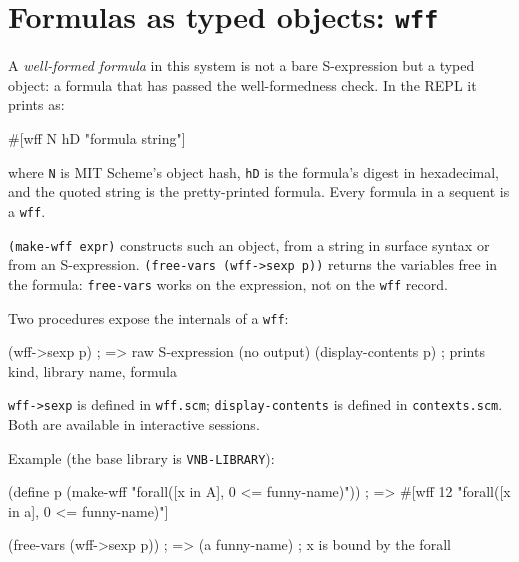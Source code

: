 \section{Formulas as typed objects: \texttt{wff}}
\label{chap:syntax-contexts}

A \emph{well-formed formula} in this system is not a bare S-expression
but a typed object: a formula that has passed the well-formedness check.  In the REPL it prints as:
\begin{VNBsnip}
#[wff N hD "formula string"]
\end{VNBsnip}
where \texttt{N} is MIT Scheme's object hash, \texttt{hD} is the
formula's digest in hexadecimal, and the quoted string is the
pretty-printed formula.  Every formula in a sequent is a \texttt{wff}.

\texttt{(make-wff expr)} constructs such an object, from a string in
surface syntax or from an S-expression.  \texttt{(free-vars (wff->sexp p))}
returns the variables free in the formula: \texttt{free-vars} works on
the expression, not on the \texttt{wff} record.

Two procedures expose the internals of a \texttt{wff}:
\begin{VNBsnip}
(wff->sexp p)        ; => raw S-expression (no output)
(display-contents p) ; prints kind, library name, formula
\end{VNBsnip}
\texttt{wff->sexp} is defined in \texttt{wff.scm};
\texttt{display-contents} is defined in \texttt{contexts.scm}.
Both are available in interactive sessions.

Example (the base library is \texttt{VNB-LIBRARY}):
\begin{VNBsnip}
(define p (make-wff "forall([x in A], 0 <= funny-name)"))
; => #[wff 12 "forall([x in a], 0 <= funny-name)"]

(free-vars (wff->sexp p))
; => (a funny-name)   ; x is bound by the forall
\end{VNBsnip}

